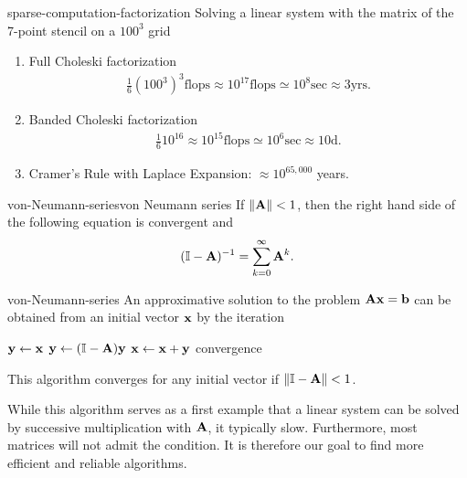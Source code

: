 \begin{Example}{sparse-computation-factorization}
  Solving a linear system with the matrix of the 7-point stencil on a $100^3$ grid
  \begin{enumerate}
  \item Full Choleski factorization
    \begin{gather}
      \frac16 \left(100^3\right)^3\text{flops}\approx 10^{17}\text{flops}
      \simeq 10^8\text{sec} \approx 3\text{yrs.}
    \end{gather}
  \item Banded Choleski factorization
    \begin{gather}
      \frac16 10^{16} \approx 10^{15}\text{flops}
      \simeq 10^6\text{sec} \approx 10\text{d}.
    \end{gather}
  \item Cramer's Rule with Laplace Expansion: $\approx 10^{65,000}$ years.
  \end{enumerate}
\end{Example}


\begin{Theorem*}{von-Neumann-series}{von Neumann series}
  If $\lVert\mathbf A\rVert<1$, then the right hand side of the following
  equation is convergent and
  \begin{gather}
    (\mathbb I-\mathbf A)^{-1} = \sum_{k=0}^{\infty} \mathbf A^k.
  \end{gather}
\end{Theorem*}

\begin{Algorithm}{von-Neumann-series}
  An approximative solution to the problem $\mathbf A\mathbf x = \mathbf b$ can
  be obtained from an initial vector $\mathbf x$ by the iteration
  \begin{algorithmic}
    \State $\mathbf y \gets \mathbf x$
    \Repeat
    \State $\mathbf y \gets (\mathbb I-\mathbf A) \mathbf y$
    \State $\mathbf x \gets \mathbf x + \mathbf y$
    \Until convergence
  \end{algorithmic}
  This algorithm converges for any initial vector if $\lVert\mathbb I-\mathbf A\rVert< 1$.
\end{Algorithm}

\begin{intro}
  While this algorithm serves as a first example that a linear system
  can be solved by successive multiplication with $\mathbf A$, it
  typically slow. Furthermore, most matrices will not admit the
  condition. It is therefore our goal to find more efficient and
  reliable algorithms.
\end{intro}

